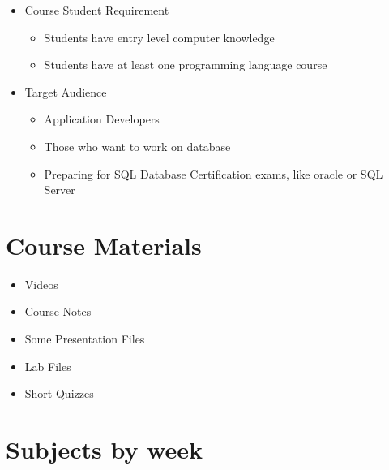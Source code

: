\documentclass[
  letterpaper,
  DIV=11,
  numbers=noendperiod]{scrreprt}
\providecommand{\tightlist}{%
  \setlength{\itemsep}{0pt}\setlength{\parskip}{0pt}}\usepackage{longtable,booktabs,array}
\begin{document}
\begin{itemize}
\tightlist
\item
  Course Student Requirement

  \begin{itemize}
  \tightlist
  \item
    Students have entry level computer knowledge
  \item
    Students have at least one programming language course
  \end{itemize}
\item
  Target Audience

  \begin{itemize}
  \tightlist
  \item
    Application Developers
  \item
    Those who want to work on database
  \item
    Preparing for SQL Database Certification exams, like oracle or SQL
    Server
  \end{itemize}
\end{itemize}

\section{Course Materials}\label{course-materials}

\begin{itemize}
\tightlist
\item
  Videos
\item
  Course Notes
\item
  Some Presentation Files
\item
  Lab Files
\item
  Short Quizzes
\end{itemize}

\section{Subjects by week}\label{subjects-by-week}
\end{document}
